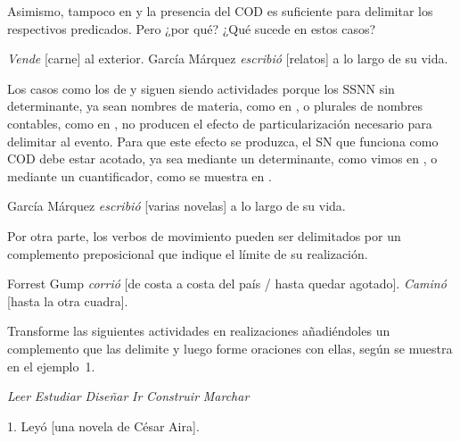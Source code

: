 Asimismo, tampoco en  y  la presencia
del COD es suficiente para delimitar los respectivos predicados. Pero ¿por qué?
¿Qué sucede en estos casos?

\begin{exe}
  \ex\label{ex:08-carne} \textit{Vende} [carne] al exterior.
  \ex\label{ex:08-relatos} García Márquez \textit{escribió} [relatos] a lo largo
      de su vida.
\end{exe}

Los casos como los de  y  siguen siendo
actividades porque los SSNN sin determinante, ya sean nombres de materia, como
 en , o plurales de nombres contables, como
 en , no producen el efecto de
particularización necesario para delimitar al evento. Para que este efecto se
produzca, el SN que funciona como COD debe estar acotado, ya sea mediante un
determinante, como vimos en , o mediante un cuantificador,
como se muestra en .

\begin{exe}
  \ex\label{ex:08-varias} García Márquez \textit{escribió} [varias novelas] a lo
      largo de su vida.
\end{exe}

Por otra parte, los verbos de movimiento pueden ser delimitados por un
complemento preposicional que indique el límite de su realización.

\begin{exe}
  \ex Forrest Gump \textit{corrió} [de costa a costa del país / hasta quedar
      agotado].
  \ex \textit{Caminó} [hasta la otra cuadra].
\end{exe}

\begin{ejercicio}\label{ej:08-delimitar}
Transforme las siguientes actividades en realizaciones añadiéndoles un
complemento que las delimite y luego forme oraciones con ellas, según se muestra
en el ejemplo~1.

\begin{exe}
  \ex \textit{Leer}
  \ex \textit{Estudiar}
  \ex \textit{Diseñar}
  \ex \textit{Ir}
  \ex \textit{Construir}
  \ex \textit{Marchar}
\end{exe}

\begin{resuelto}
1. Leyó [una novela de César Aira].
\end{resuelto}
\end{ejercicio}

